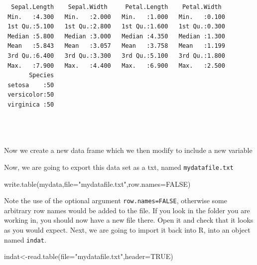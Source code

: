 \documentclass[
  letterpaper,
  DIV=11,
  numbers=noendperiod]{scrartcl}
\newenvironment{Shaded}{\begin{snugshade}}{\end{snugshade}}
\newcommand{\AttributeTok}[1]{\textcolor[rgb]{0.40,0.45,0.13}{#1}}
\newcommand{\ConstantTok}[1]{\textcolor[rgb]{0.56,0.35,0.01}{#1}}
\newcommand{\FunctionTok}[1]{\textcolor[rgb]{0.28,0.35,0.67}{#1}}
\newcommand{\NormalTok}[1]{\textcolor[rgb]{0.00,0.23,0.31}{#1}}
\newcommand{\OtherTok}[1]{\textcolor[rgb]{0.00,0.23,0.31}{#1}}
\newcommand{\SpecialCharTok}[1]{\textcolor[rgb]{0.37,0.37,0.37}{#1}}
\newcommand{\StringTok}[1]{\textcolor[rgb]{0.13,0.47,0.30}{#1}}
\begin{document}
\begin{verbatim}
  Sepal.Length    Sepal.Width     Petal.Length    Petal.Width   
 Min.   :4.300   Min.   :2.000   Min.   :1.000   Min.   :0.100  
 1st Qu.:5.100   1st Qu.:2.800   1st Qu.:1.600   1st Qu.:0.300  
 Median :5.800   Median :3.000   Median :4.350   Median :1.300  
 Mean   :5.843   Mean   :3.057   Mean   :3.758   Mean   :1.199  
 3rd Qu.:6.400   3rd Qu.:3.300   3rd Qu.:5.100   3rd Qu.:1.800  
 Max.   :7.900   Max.   :4.400   Max.   :6.900   Max.   :2.500  
       Species  
 setosa    :50  
 versicolor:50  
 virginica :50  
                
                
                
\end{verbatim}

Now we create a new data frame which we then modify to include a new
variable

\begin{Shaded}
\end{Shaded}

Now, we are going to export this data set as a txt, named
\texttt{mydatafile.txt}

\begin{Shaded}
\begin{Highlighting}[]
\FunctionTok{write.table}\NormalTok{(mydata,}\AttributeTok{file=}\StringTok{"mydatafile.txt"}\NormalTok{,}\AttributeTok{row.names=}\ConstantTok{FALSE}\NormalTok{)}
\end{Highlighting}
\end{Shaded}

Note the use of the optional argument \texttt{row.names=FALSE},
otherwise some arbitrary row names would be added to the file. If you
look in the folder you are working in, you should now have a new file
there. Open it and check that it looks as you would expect. Next, we are
going to import it back into R, into an object named \texttt{indat}.

\begin{Shaded}
\begin{Highlighting}[]
\NormalTok{indat}\OtherTok{\textless{}{-}}\FunctionTok{read.table}\NormalTok{(}\AttributeTok{file=}\StringTok{"mydatafile.txt"}\NormalTok{,}\AttributeTok{header=}\ConstantTok{TRUE}\NormalTok{)}
\end{Highlighting}
\end{Shaded}
\end{document}
